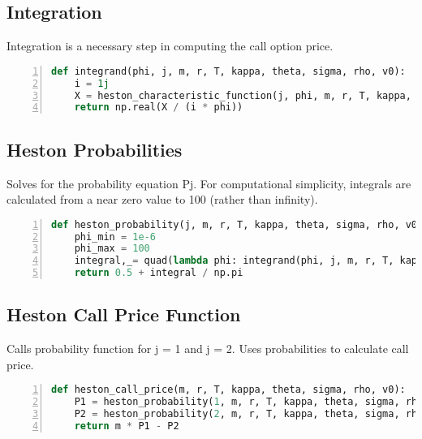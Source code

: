 \documentclass{article}
\begin{document}
\subsection{Integration}
Integration is a necessary step in computing the call option price.
\lstset{firstnumber=last}
\begin{lstlisting}[language=Python, caption={Integrate}, label={lst:imports}, numbers=left]
def integrand(phi, j, m, r, T, kappa, theta, sigma, rho, v0):
    i = 1j
    X = heston_characteristic_function(j, phi, m, r, T, kappa, theta, sigma, rho, v0)
    return np.real(X / (i * phi))
\end{lstlisting}


\subsection{Heston Probabilities}
Solves for the probability equation Pj. For computational simplicity, integrals are calculated from a near zero value to 100 (rather than infinity).
\lstset{firstnumber=last}
\begin{lstlisting}[language=Python, caption={Calculate Heston probabilities}, label={lst:imports}, numbers=left]
def heston_probability(j, m, r, T, kappa, theta, sigma, rho, v0):
    phi_min = 1e-6
    phi_max = 100
    integral,_= quad(lambda phi: integrand(phi, j, m, r, T, kappa, theta, sigma, rho,v0), phi_min, phi_max)
    return 0.5 + integral / np.pi
\end{lstlisting}


\subsection{Heston Call Price Function}
Calls probability function for j = 1 and j = 2. Uses probabilities to calculate call price. 
\lstset{firstnumber=last}
\begin{lstlisting}[language=Python, caption={Calculate European Call Price}, label={lst:imports}, numbers=left]
def heston_call_price(m, r, T, kappa, theta, sigma, rho, v0):
    P1 = heston_probability(1, m, r, T, kappa, theta, sigma, rho, v0)
    P2 = heston_probability(2, m, r, T, kappa, theta, sigma, rho, v0)
    return m * P1 - P2
\end{lstlisting}
\end{document}
